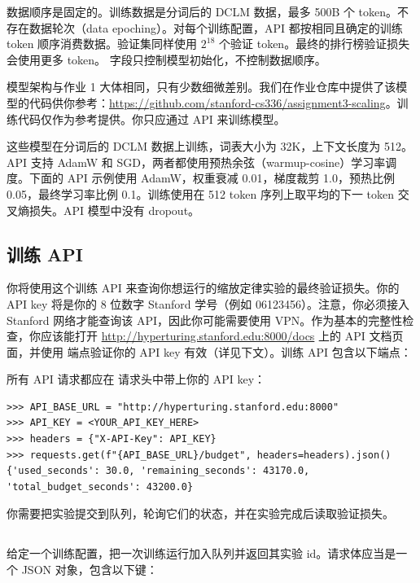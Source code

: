 数据顺序是固定的。训练数据是分词后的 DCLM 数据，最多 500B 个 token。不存在数据轮次（data epoching）。对每个训练配置，API 都按相同且确定的训练 token 顺序消费数据。验证集同样使用 $2^{18}$ 个验证 token。最终的排行榜验证损失会使用更多 token。 字段只控制模型初始化，不控制数据顺序。

模型架构与作业 1 大体相同，只有少数细微差别。我们在作业仓库中提供了该模型的代码供你参考：\url{https://github.com/stanford-cs336/assignment3-scaling}。训练代码仅作为参考提供。你只应通过 API 来训练模型。

这些模型在分词后的 DCLM 数据上训练，词表大小为 32K，上下文长度为 512。API 支持 AdamW 和 SGD，两者都使用预热余弦（warmup-cosine）学习率调度。下面的 API 示例使用 AdamW，权重衰减 0.01，梯度裁剪 1.0，预热比例 0.05，最终学习率比例 0.1。训练使用在 512 token 序列上取平均的下一 token 交叉熵损失。API 模型中没有 dropout。

\subsection{训练 API}

你将使用这个训练 API 来查询你想运行的缩放定律实验的最终验证损失。你的 API key 将是你的 8 位数字 Stanford 学号（例如 06123456）。注意，你必须接入 Stanford 网络才能查询该 API，因此你可能需要使用 VPN。作为基本的完整性检查，你应该能打开 \url{http://hyperturing.stanford.edu:8000/docs} 上的 API 文档页面，并使用  端点验证你的 API key 有效（详见下文）。训练 API 包含以下端点：

所有 API 请求都应在  请求头中带上你的 API key：

\begin{lstlisting}
>>> API_BASE_URL = "http://hyperturing.stanford.edu:8000"
>>> API_KEY = <YOUR_API_KEY_HERE>
>>> headers = {"X-API-Key": API_KEY}
>>> requests.get(f"{API_BASE_URL}/budget", headers=headers).json()
{'used_seconds': 30.0, 'remaining_seconds': 43170.0, 'total_budget_seconds': 43200.0}
\end{lstlisting}

你需要把实验提交到队列，轮询它们的状态，并在实验完成后读取验证损失。

\subsection*{}

给定一个训练配置，把一次训练运行加入队列并返回其实验 id。请求体应当是一个 JSON 对象，包含以下键：

